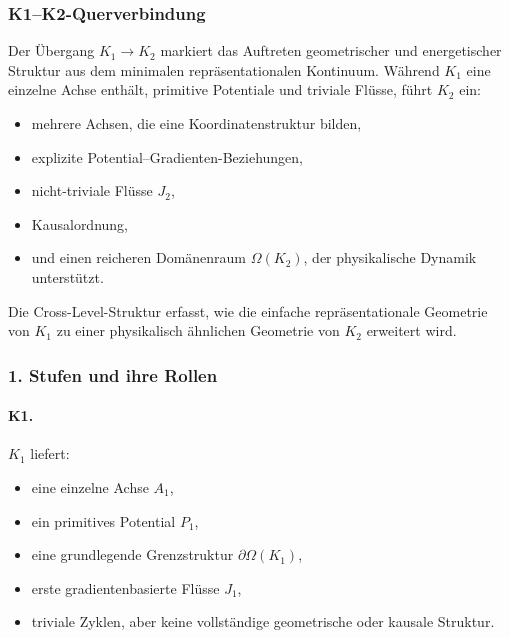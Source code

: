 
\subsubsection{K1–K2-Querverbindung}
\label{sec:crossk-k1-k2}

Der Übergang $K_1 \rightarrow K_2$ markiert das Auftreten geometrischer und
energetischer Struktur aus dem minimalen repräsentationalen Kontinuum.
Während $K_1$ eine einzelne Achse enthält, primitive Potentiale und triviale
Flüsse, führt $K_2$ ein:
\begin{itemize}
  \item mehrere Achsen, die eine Koordinatenstruktur bilden,
  \item explizite Potential--Gradienten-Beziehungen,
  \item nicht-triviale Flüsse $J_2$,
  \item Kausalordnung,
  \item und einen reicheren Domänenraum $\Omega(K_2)$, der physikalische
        Dynamik unterstützt.
\end{itemize}

Die Cross-Level-Struktur erfasst, wie die einfache repräsentationale Geometrie
von $K_1$ zu einer physikalisch ähnlichen Geometrie von $K_2$ erweitert wird.

\subsubsection{1. Stufen und ihre Rollen}

\paragraph{K1.}
$K_1$ liefert:
\begin{itemize}
  \item eine einzelne Achse $A_1$,
  \item ein primitives Potential $P_1$,
  \item eine grundlegende Grenzstruktur $\partial\Omega(K_1)$,
  \item erste gradientenbasierte Flüsse $J_1$,
  \item triviale Zyklen, aber keine vollständige geometrische oder kausale Struktur.
\end{itemize}

